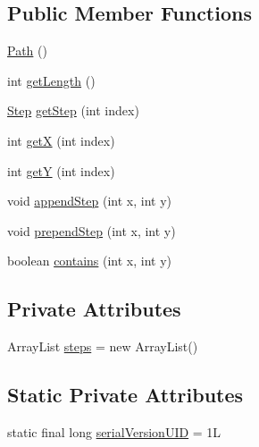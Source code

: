 \subsection*{Public Member Functions}
\begin{DoxyCompactItemize}
\item 
\mbox{\hyperlink{classorg_1_1newdawn_1_1slick_1_1util_1_1pathfinding_1_1_path_a3c986d4c312a5f30a37763a0b757bdd1}{Path}} ()
\item 
int \mbox{\hyperlink{classorg_1_1newdawn_1_1slick_1_1util_1_1pathfinding_1_1_path_a6aa805d1ba541d0136586273e1e68b2a}{get\+Length}} ()
\item 
\mbox{\hyperlink{classorg_1_1newdawn_1_1slick_1_1util_1_1pathfinding_1_1_path_1_1_step}{Step}} \mbox{\hyperlink{classorg_1_1newdawn_1_1slick_1_1util_1_1pathfinding_1_1_path_acc362a056f4565a8eec1361266eac671}{get\+Step}} (int index)
\item 
int \mbox{\hyperlink{classorg_1_1newdawn_1_1slick_1_1util_1_1pathfinding_1_1_path_a87c7bbf87033a3481744cf8a65307ef7}{getX}} (int index)
\item 
int \mbox{\hyperlink{classorg_1_1newdawn_1_1slick_1_1util_1_1pathfinding_1_1_path_ae3dc411882e33d0d196173964e938f81}{getY}} (int index)
\item 
void \mbox{\hyperlink{classorg_1_1newdawn_1_1slick_1_1util_1_1pathfinding_1_1_path_ad78d2c2efdbe0353192021b46fbb782e}{append\+Step}} (int x, int y)
\item 
void \mbox{\hyperlink{classorg_1_1newdawn_1_1slick_1_1util_1_1pathfinding_1_1_path_ae8736f56aa7a12a793c8ac8c51a77f70}{prepend\+Step}} (int x, int y)
\item 
boolean \mbox{\hyperlink{classorg_1_1newdawn_1_1slick_1_1util_1_1pathfinding_1_1_path_a74af06518bbc01b02caa8ffa2acc7edb}{contains}} (int x, int y)
\end{DoxyCompactItemize}
\subsection*{Private Attributes}
\begin{DoxyCompactItemize}
\item 
Array\+List \mbox{\hyperlink{classorg_1_1newdawn_1_1slick_1_1util_1_1pathfinding_1_1_path_ac2472e1febece895b3e77854043fb4ad}{steps}} = new Array\+List()
\end{DoxyCompactItemize}
\subsection*{Static Private Attributes}
\begin{DoxyCompactItemize}
\item 
static final long \mbox{\hyperlink{classorg_1_1newdawn_1_1slick_1_1util_1_1pathfinding_1_1_path_a11534240eff7a163acf2c36a563af4e8}{serial\+Version\+U\+ID}} = 1L
\end{DoxyCompactItemize}


